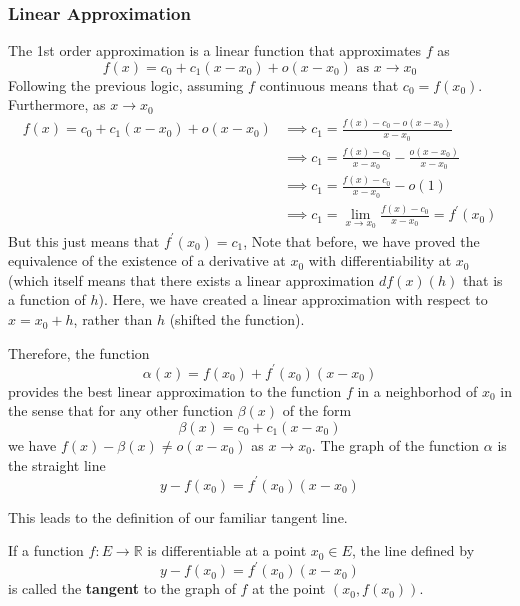 \documentclass{article}
\begin{document}
    \subsubsection{Linear Approximation}
    The 1st order approximation is a linear function that approximates $f$ as
    \[f(x) = c_0 + c_1(x - x_0) + o(x - x_0) \text{ as } x \rightarrow x_0\]
    Following the previous logic, assuming $f$ continuous means that $c_0 = f(x_0)$. Furthermore, as $x \rightarrow x_0$
    \begin{align*}
        f(x) = c_0 + c_1(x - x_0) + o(x - x_0) & \implies c_1 = \frac{f(x) - c_0 - o(x - x_0)}{x - x_0} \\
        & \implies c_1 = \frac{f(x) - c_0}{x - x_0} - \frac{o(x - x_0)}{x - x_0}\\
        & \implies c_1 = \frac{f(x) - c_0}{x - x_0} - o(1) \\
        & \implies c_1 = \lim_{x \rightarrow x_0} \frac{f(x) - c_0}{x - x_0} = f^\prime (x_0)
    \end{align*}
    But this just means that $f^\prime (x_0) = c_1$, Note that before, we have proved the equivalence of the existence of a derivative at $x_0$ with differentiability at $x_0$ (which itself means that there exists a linear approximation $df(x)(h)$ that is a function of $h$). Here, we have created a linear approximation with respect to $x = x_0 + h$, rather than $h$ (shifted the function). 

    Therefore, the function 
    \[\alpha (x) = f(x_0) + f^\prime (x_0) (x - x_0)\]
    provides the best linear approximation to the function $f$ in a neighborhod of $x_0$ in the sense that for any other function $\beta(x)$ of the form 
    \[\beta(x) = c_0 + c_1 (x - x_0)\]
    we have $f(x) - \beta(x) \neq o(x - x_0)$ as $x \rightarrow x_0$. The graph of the function $\alpha$ is the straight line
    \[y - f(x_0) = f^\prime (x_0) (x - x_0)\]

    This leads to the definition of our familiar tangent line. 

    \begin{definition}
      If a function $f: E \longrightarrow \mathbb{R}$ is differentiable at a point $x_0 \in E$, the line defined by
      \[y - f(x_0) = f^\prime (x_0) (x - x_0)\]
      is called the \textbf{tangent} to the graph of $f$ at the point $(x_0, f(x_0))$. 
    \end{definition}
\end{document}
